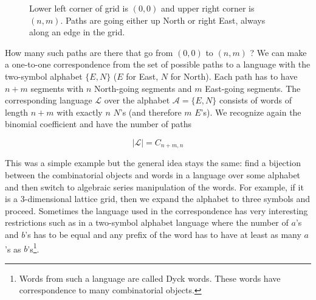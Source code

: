 \begin{figure}[t]
\caption{Lower left corner of grid is $(0, 0)$ and upper right corner is $(n, m)$. Paths are going either up North or right East, always along an edge in the grid.}
\end{figure}

How many such paths are there that go from $(0, 0)$ to $(n, m)$ ? We can make a one-to-one correspondence from the set of possible paths to a language with the two-symbol alphabet $\{E, N\}$ ($E$ for East, $N$ for North). Each path has to have $n + m$ segments with $n$ North-going segments and $m$ East-going segments. The corresponding language $\mathcal{L}$ over the alphabet $\mathcal{A}= \{E, N\}$ consists of words of length $n + m$ with exactly $n$ $N$'s (and therefore $m$ $E$'s). We recognize again the binomial coefficient and have the number of paths

$$
|\mathcal{L}| = C_{n + m, n}
$$

 This was a simple example but the general idea stays the same: find a bijection between the combinatorial objects and words in a language over some alphabet and then switch to algebraic series manipulation of the words. For example, if it is a 3-dimensional lattice grid, then we expand the alphabet to three symbols and proceed. Sometimes the language used in the correspondence has very interesting restrictions such as in a two-symbol alphabet language where the number of $a$'s and $b$'s has to be equal and any prefix of the word has to have at least as many $a$'s as $b$'s\footnote{Words from such a language are called Dyck words. These words have correspondence to many combinatorial objects.}. 

